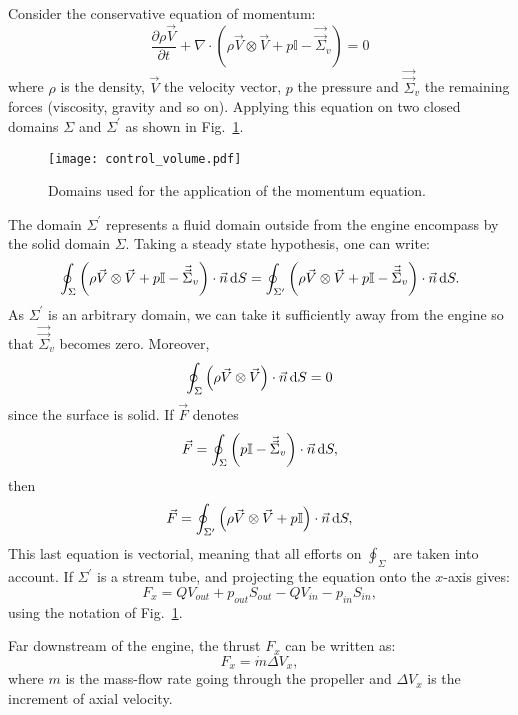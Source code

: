 Consider the conservative equation of momentum:
\begin{equation}
	\frac{\partial \rho \vec{V}}{\partial t} 
	+ \nabla \cdot (\rho \vec{V} \otimes \vec{V} + p \mathbb{I} - \vec{\vec{\Sigma}}_v) = 0
\end{equation}
where $\rho$ is the density, $\vec{V}$ the velocity vector, $p$ the pressure and
$\vec{\vec{\Sigma}}_v$ the remaining forces (viscosity, gravity and so on).
Applying this equation on two closed domains $\Sigma$ and $\Sigma^\prime$ as
shown in Fig.~\ref{fig:cror_control_volume}.
\begin{figure}[htb]
  \centering
  \texttt{[image: control\_volume.pdf]}
  \caption{Domains used for the application of the momentum equation.}
  \label{fig:cror_control_volume}
\end{figure}
The domain $\Sigma^\prime$ represents a fluid domain outside from the
engine encompass by the solid domain $\Sigma$.
Taking a steady state hypothesis, one can write:
\begin{equation}
	\oint_{\Sigma} \left(\rho \vec{V} \otimes \vec{V} + 
	                       p \mathbb{I} - 
	                       \vec{\vec{\Sigma}}_v \right) \cdot \vec{n} \mathop{}\!\mathrm{d} S
    =
   	\oint_{\Sigma^\prime} \left(\rho \vec{V} \otimes \vec{V} + 
	                       p \mathbb{I} - 
	                       \vec{\vec{\Sigma}}_v \right) \cdot \vec{n} \mathop{}\!\mathrm{d} S.
\end{equation} 
As $\Sigma^\prime$ is an arbitrary domain, we can take it sufficiently
away from the engine so that $\vec{\vec{\Sigma}}_v$ becomes zero.
Moreover, 
\begin{equation}
	\oint_{\Sigma} \left(\rho \vec{V} \otimes \vec{V} \right) \cdot \vec{n} \mathop{}\!\mathrm{d} S = 0
\end{equation}
since the surface is solid. If $\vec{F}$ denotes
\begin{equation}
	\vec{F} = \oint_{\Sigma} \left(p \mathbb{I} - 
	\vec{\vec{\Sigma}}_v \right) \cdot \vec{n} \mathop{}\!\mathrm{d} S,
\end{equation}
then
\begin{equation}
	\vec{F} = \oint_{\Sigma^\prime} \left(\rho \vec{V} \otimes \vec{V} +
	p \mathbb{I} \right) \cdot \vec{n} \mathop{}\!\mathrm{d} S,
\end{equation}
This last equation is vectorial, meaning that all efforts on 
$\oint_{\Sigma}$ are taken into account.
If $\Sigma^\prime$ is a stream tube, and projecting the equation
onto the $x$-axis gives:
\begin{equation}
	F_x = Q V_{out} + p_{out} S_{out}
	- Q V_{in} - p_{in} S_{in},
\end{equation}
using the notation of Fig.~\ref{fig:cror_control_volume}.

Far downstream of the engine, 
the thrust $F_x$ can be written as:
\begin{equation}
	F_x = \dot{m} \Delta V_x,
\end{equation}
where $m$ is the mass-flow rate going through the
propeller and $\Delta V_x$ is
the increment of axial velocity.


